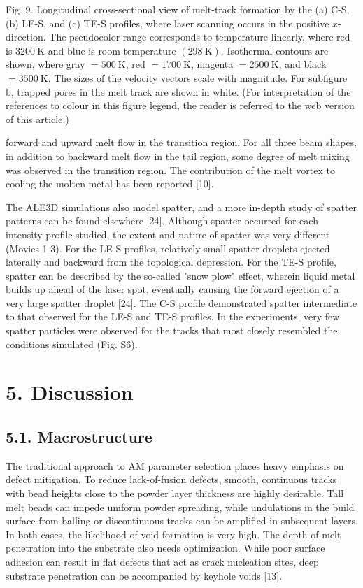 \documentclass[10pt]{article}
\begin{document}
Fig. 9. Longitudinal cross-sectional view of melt-track formation by the (a) C-S, (b) LE-S, and (c) TE-S profiles, where laser scanning occurs in the positive $x$-direction. The pseudocolor range corresponds to temperature linearly, where red is $3200 \mathrm{~K}$ and blue is room temperature $(298 \mathrm{~K})$. Isothermal contours are shown, where gray $=500 \mathrm{~K}$, red $=1700 \mathrm{~K}$, magenta $=2500 \mathrm{~K}$, and black $=3500 \mathrm{~K}$. The sizes of the velocity vectors scale with magnitude. For subfigure b, trapped pores in the melt track are shown in white. (For interpretation of the references to colour in this figure legend, the reader is referred to the web version of this article.)

forward and upward melt flow in the transition region. For all three beam shapes, in addition to backward melt flow in the tail region, some degree of melt mixing was observed in the transition region. The contribution of the melt vortex to cooling the molten metal has been reported [10].

The ALE3D simulations also model spatter, and a more in-depth study of spatter patterns can be found elsewhere [24]. Although spatter occurred for each intensity profile studied, the extent and nature of spatter was very different (Movies 1-3). For the LE-S profiles, relatively small spatter droplets ejected laterally and backward from the topological depression. For the TE-S profile, spatter can be described by the so-called "snow plow" effect, wherein liquid metal builds up ahead of the laser spot, eventually causing the forward ejection of a very large spatter droplet [24]. The C-S profile demonstrated spatter intermediate to that observed for the LE-S and TE-S profiles. In the experiments, very few spatter particles were observed for the tracks that most closely resembled the conditions simulated (Fig. S6).

\section*{5. Discussion}
\subsection*{5.1. Macrostructure}
The traditional approach to AM parameter selection places heavy emphasis on defect mitigation. To reduce lack-of-fusion defects, smooth, continuous tracks with bead heights close to the powder layer thickness are highly desirable. Tall melt beads can impede uniform powder spreading, while undulations in the build surface from balling or discontinuous tracks can be amplified in subsequent layers. In both cases, the likelihood of void formation is very high. The depth of melt penetration into the substrate also needs optimization. While poor surface adhesion can result in flat defects that act as crack nucleation sites, deep substrate penetration can be accompanied by keyhole voids [13].
\end{document}

